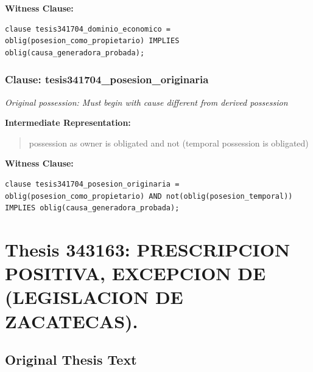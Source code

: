 \documentclass[11pt,a4paper]{article}
\begin{document}
\textbf{Witness Clause:}

\begin{lstlisting}[style=witnessstyle, language=Witness]
clause tesis341704_dominio_economico = oblig(posesion_como_propietario) IMPLIES oblig(causa_generadora_probada);
\end{lstlisting}

\subsubsection{Clause: tesis341704\_posesion\_originaria}

\textit{Original possession: Must begin with cause different from derived possession}

\textbf{Intermediate Representation:}

\begin{quote}
possession as owner is obligated and not (temporal possession is obligated)
\end{quote}

\textbf{Witness Clause:}

\begin{lstlisting}[style=witnessstyle, language=Witness]
clause tesis341704_posesion_originaria = oblig(posesion_como_propietario) AND not(oblig(posesion_temporal)) IMPLIES oblig(causa_generadora_probada);
\end{lstlisting}

\newpage

\section{Thesis 343163: PRESCRIPCION POSITIVA, EXCEPCION DE (LEGISLACION DE ZACATECAS).}
\label{thesis:343163}

\subsection{Original Thesis Text}
\end{document}
